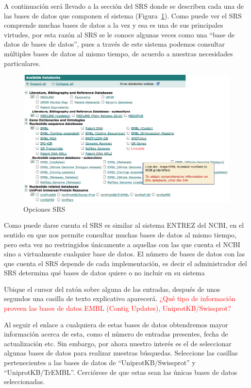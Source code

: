 \documentclass[letter,11pt]{book}
\begin{document}
A continuación será llevado a la sección del SRS donde se describen cada una de las bases de datos que componen el sistema (Figura~\ref{SRSDBs}). Como puede ver el SRS comprende muchas bases de datos a la vez y esa es una de sus principales virtudes, por esta razón al SRS se le conoce algunas veces como una “base de datos de bases de datos”, pues a través de este sistema podemos consultar múltiples bases de datos al mismo tiempo, de acuerdo a nuestras necesidades particulares.

\begin{figure}[ht]
\centering
   \includegraphics[width=12cm]{Figs/SRSDBs.png}
  \caption{\label{SRSDBs}Opciones SRS}
\end{figure}

Como puede darse cuenta el SRS es similar al sistema ENTREZ del NCBI, en el sentido en que nos permite consultar muchas bases de datos al mismo tiempo, pero esta vez no restringidos únicamente a aquellas con las que cuenta el NCBI sino a virtualmente cualquier base de datos. El número de bases de datos con las que cuenta el SRS depende de cada implementación, es decir el administrador del SRS determina qué bases de datos quiere o no incluir en su sistema

Ubique el cursor del ratón sobre alguna de las entradas, después de unos segundos una casilla de texto explicativo aparecerá. \textcolor{red}{¿Qué tipo de información proveen las bases de datos EMBL (Contig Updates), UniprotKB/Swissprot?}

Al seguir el enlace a cualquiera de estas bases de datos obtendremos mayor información acerca de esta, como el número de entradas presentes, fecha de actualización etc. Sin embargo, por ahora nuestro interés es el de seleccionar algunas bases de datos para realizar nuestras búsquedas. Seleccione las casillas pertenecientes a las bases de datos de ``UniprotKB/Swissprot'' y ``UniprotKB/TrEMBL''. Cerciórese de que estas sean las únicas bases de datos seleccionadas.
\end{document}
